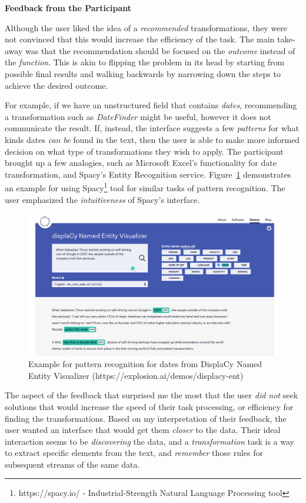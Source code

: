 \documentclass[12pt,letterpaper]{article}
\begin{document}
\textbf{Feedback from the Participant}

Although the user liked the idea of a \textit{recommended} transformations, they were not convinced that this would increase the efficiency of the task. The main take-away was that the recommendation should be focused on the \textit{outcome} instead of the \textit{function}. This is akin to flipping the problem in its head by starting from possible final results and walking backwards by narrowing down the steps to achieve the desired outcome. 

For example, if we have an unstructured field that contains \textit{dates}, recommending a transformation such as \textit{DateFinder} might be useful, however it does not communicate the result. If, instead, the interface suggests a few \textit{patterns} for what kinds dates \textit{can be} found in the text, then the user is able to make more informed decision on what type of transformations they wish to apply. The participant brought up a few analogies, such as Microsoft Excel's functionality for date transformation, and Spacy's Entity Recognition service. Figure~\ref{fig::1} demonstrates an example for using Spacy\footnote{https://spacy.io/ - Industrial-Strength
Natural Language Processing tool} tool for similar tasks of  pattern recognition. The user emphasized the \textit{intuitiveness} of  Spacy's interface.

\begin{figure}[h]
\centering
\includegraphics[scale=.3]{figures/m3/spacy_date_finder.png}
\caption{Example for pattern recognition for dates from DisplaCy Named Entity Visualizer (https://explosion.ai/demos/displacy-ent)}
\label{fig::1}
\end{figure}

The aspect of the feedback that surprised me the most that the user \textit{did not} seek solutions that would increase the speed of their task processing, or efficiency for finding the transformations. Based on my interpretation of their feedback, the user wanted an interface that would get them \textit{closer} to the data. Their ideal interaction seems to be \textit{discovering} the data, and a \textit{transformation} task is a way to extract specific elements from the text, and \textit{remember} those rules for subsequent streams of the same data.  
\end{document}
